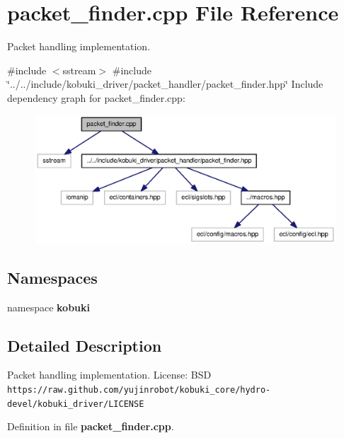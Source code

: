 \section{packet\-\_\-finder.\-cpp \-File \-Reference}
\label{packet__finder_8cpp}


\-Packet handling implementation.  


{\ttfamily \#include $<$sstream$>$}\*
{\ttfamily \#include \char`\"{}../../include/kobuki\-\_\-driver/packet\-\_\-handler/packet\-\_\-finder.\-hpp\char`\"{}}\*
\-Include dependency graph for packet\-\_\-finder.\-cpp\-:
\nopagebreak
\begin{figure}[H]
\begin{center}
\leavevmode
\includegraphics[width=350pt]{packet__finder_8cpp__incl}
\end{center}
\end{figure}
\subsection*{\-Namespaces}
\begin{DoxyCompactItemize}
\item 
namespace {\bf kobuki}
\end{DoxyCompactItemize}


\subsection{\-Detailed \-Description}
\-Packet handling implementation. \-License\-: \-B\-S\-D {\tt https\-://raw.\-github.\-com/yujinrobot/kobuki\-\_\-core/hydro-\/devel/kobuki\-\_\-driver/\-L\-I\-C\-E\-N\-S\-E} 

\-Definition in file {\bf packet\-\_\-finder.\-cpp}.


